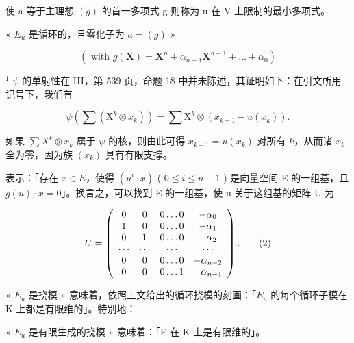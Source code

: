 使 a 等于主理想 \((g)\) 的首一多项式 g 则称为 u 在 V 上限制的最小多项式。

« \(E_{u}\) 是循环的，且零化子为 \(a = (g)\) »

\[
\left(\text { with } g (\mathbf {X}) = \mathbf {X} ^ {n} + \alpha_ {n - 1} \mathbf {X} ^ {n - 1} + \dots + \alpha_ {0}\right)
\]

\(^{1}\) \(\psi\) 的单射性在 III，第 539 页，命题 18 中并未陈述，其证明如下：在引文所用记号下，我们有

\[
\psi \left(\sum \left(\mathrm{X} ^ {k} \otimes x _ {k}\right)\right) = \sum \mathrm{X} ^ {k} \otimes \left(x _ {k - 1} - u (x _ {k})\right).
\]

如果 \(\sum X^k \otimes x_k\) 属于 \(\psi\) 的核，则由此可得 \(x_{k-1} = u(x_k)\) 对所有 \(k\)，从而诸 \(x_k\) 全为零，因为族 \((x_k)\) 具有有限支撑。

表示：「存在 \(x \in E\)，使得 \((u^{i} \cdot x)\) ( \(0 \leqslant i \leqslant n - 1\) ) 是向量空间 E 的一组基，且 \(g(u) \cdot x = 0\)」。换言之，可以找到 E 的一组基，使 u 关于这组基的矩阵 U 为

\[
U = \left( \begin{array}{c c c c} 0 & 0 & 0 \dots 0 & - \alpha_ {0} \\ 1 & 0 & 0 \dots 0 & - \alpha_ {1} \\ 0 & 1 & 0 \dots 0 & - \alpha_ {2} \\ \cdots & \cdots & \cdots & \cdots \\ 0 & 0 & 0 \dots 0 & - \alpha_ {n - 2} \\ 0 & 0 & 0 \dots 1 & - \alpha_ {n - 1} \end{array} \right).\tag{2}
\]

« \(E_{u}\) 是挠模 » 意味着，依照上文给出的循环挠模的刻画：「\(E_{u}\) 的每个循环子模在 K 上都是有限维的」。特别地：

« \(E_{u}\) 是有限生成的挠模 » 意味着：「E 在 K 上是有限维的」。

